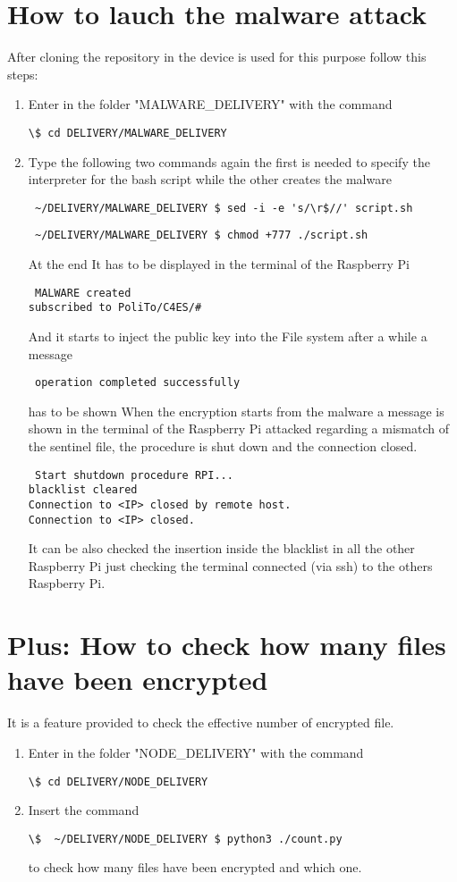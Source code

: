 \section{How to lauch the malware attack}
After cloning the repository in the device is used for this purpose follow this steps:
\begin{enumerate}
\item Enter in the folder "MALWARE\_DELIVERY" with the command  \begin{verbatim}\$ cd DELIVERY/MALWARE_DELIVERY\end{verbatim} 
\item Type the following two commands again  the first is needed to specify the interpreter for the bash script while the other creates the malware  \begin{verbatim} ~/DELIVERY/MALWARE_DELIVERY $ sed -i -e 's/\r$//' script.sh \end{verbatim}
\begin{verbatim} ~/DELIVERY/MALWARE_DELIVERY $ chmod +777 ./script.sh \end{verbatim}  
At the end It has to be displayed in the terminal of the Raspberry Pi \begin{verbatim} MALWARE created
subscribed to PoliTo/C4ES/# \end{verbatim}  

And it starts to inject the public key into the File system after a while a message \begin{verbatim} operation completed successfully \end{verbatim}  has to be shown
When the encryption starts from the malware a message is shown in the terminal of the Raspberry Pi attacked regarding a mismatch of the sentinel file, the procedure is shut down and the connection closed.
\begin{verbatim} Start shutdown procedure RPI...
blacklist cleared
Connection to <IP> closed by remote host.
Connection to <IP> closed. \end{verbatim}
It can be also checked the insertion inside the blacklist in all the other Raspberry Pi just checking the terminal connected (via ssh) to the others Raspberry Pi.
\end{enumerate}
\section{Plus: How to check how many files have been encrypted}
It is a feature provided to check the effective number of encrypted file.
\begin{enumerate}
\item Enter in the folder "NODE\_DELIVERY" with the command  \begin{verbatim}\$ cd DELIVERY/NODE_DELIVERY\end{verbatim} 
\item Insert the command \begin{verbatim}\$  ~/DELIVERY/NODE_DELIVERY $ python3 ./count.py\end{verbatim} 
to check how many files have been encrypted and which one.
\end{enumerate}
